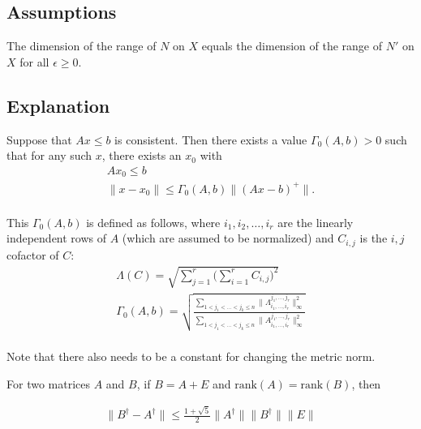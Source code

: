 \subsection{Assumptions}

The dimension of the range of $N$ on $X$ equals the dimension of the range of $N'$ on $X$ for all $\epsilon \ge 0$.


\subsection{Explanation}

\begin{theorem}
\label{hoffman}
Suppose that $Ax \le b$ is consistent.
Then there exists a value $\Gamma_0(A, b) > 0$ such that for any such $x$, there exists an $x_0$ with
\begin{align*}
Ax_0 \le b \\
\|x - x_0\| \le \Gamma_0(A, b) \|(Ax - b)^+\|. \\
\end{align*}

This $\Gamma_0(A,b)$ is defined as follows, where $i_1, i_2, \ldots, i_r$ are the linearly independent rows of $A$ (which are assumed to be normalized) and $C_{i,j}$ is the $i,j$ cofactor of $C$:
\begin{align*}
\Lambda(C) = \sqrt{\sum_{j=1}^r\bigg(\sum_{i=1}^r C_{i,j}\bigg)^2} \\
\Gamma_0(A, b) = \sqrt{\frac{\sum_{1 < j_1 < \ldots < j_k \le n} \|\Lambda^{j_1,\ldots,j_r}_{i_1,\ldots, i_r}\|_{\infty}^2}{\sum_{1 < j_1 < \ldots < j_k \le n} \|A^{j_1,\ldots,j_r}_{i_1,\ldots, i_r}\|_{\infty}^2}} \\
\end{align*}

Note that there also needs to be a constant for changing the metric norm.
\end{theorem}

\begin{theorem}
For two matrices $A$ and $B$, if $B = A + E$ and $\text{rank}(A) = \text{rank}(B)$, then

\begin{align*}
\|B^{\dagger} - A^{\dagger} \| \le \frac{1 + \sqrt{5}}{2} \|A^{\dagger}\|\|B^{\dagger}\|\|E\|
\end{align*}

\end{theorem}


